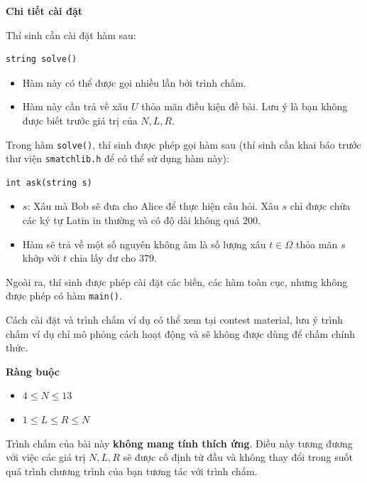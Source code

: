 \textbf{Chi tiết cài đặt}

Thí sinh cần cài đặt hàm sau:

\begin{lstlisting}
string solve()
\end{lstlisting}

\begin{itemize}
   \item Hàm này có thể được gọi nhiều lần bởi trình chấm.
   \item Hàm này cần trả về xâu $U$ thỏa mãn điều kiện đề bài. Lưu ý là bạn không được biết trước giá trị của $N,L,R$.
\end{itemize}

Trong hàm \texttt{solve()}, thí sinh được phép gọi hàm sau (thí sinh cần khai báo trước thư viện \texttt{smatchlib.h} để có thể sử dụng hàm này):

\begin{lstlisting}
int ask(string s)
\end{lstlisting}

\begin{itemize}
   \item $s$: Xâu mà Bob sẽ đưa cho Alice để thực hiện câu hỏi. Xâu $s$ chỉ được chứa các ký tự Latin in thường và có độ dài không quá $200$.
   \item Hàm sẽ trả về một số nguyên không âm là số lượng xâu $t\in \Omega$ thỏa mãn $s$ khớp với $t$ chia lấy dư cho $379$.
\end{itemize}

Ngoài ra, thí sinh được phép cài đặt các biến, các hàm toàn cục, nhưng không được phép có hàm \texttt{main()}.

Cách cài đặt và trình chấm ví dụ có thể xem tại contest material, lưu ý trình chấm ví dụ chỉ mô phỏng cách hoạt động và sẽ không được dùng để chấm chính thức.

\textbf{Ràng buộc}

\begin{itemize}
   \item $4\le N\le 13$
   \item $1\le L\le R\le N$
\end{itemize}

Trình chấm của bài này \textbf{không mang tính thích ứng}. Điều này tương đương với việc các giá trị $N,L,R$ sẽ được cố định từ đầu và không thay đổi trong suốt quá trình chương trình của bạn tương tác với trình chấm.